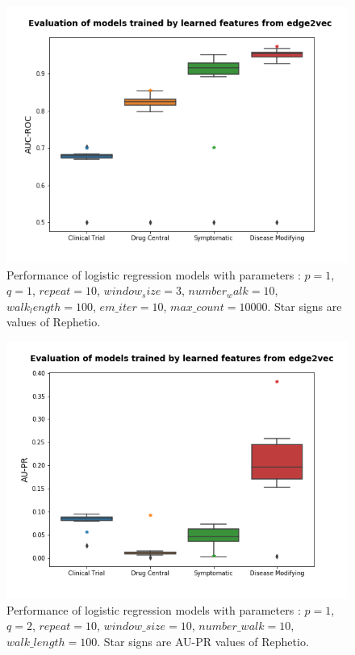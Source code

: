 \begin{figure}[!h]
    \centering
    \includegraphics[scale=0.65]
    {figures/edge2vec_roc.png}
    \captionsetup{justification=centering}
    \caption[AUC-ROCs of logistic regression models trained by learned features from edge2vec]{\label{fig:edge2vec_roc}Performance of logistic regression models with parameters : $p = 1$, $q = 1$, $repeat = 10$, $window_size = 3$, $number_walk = 10$, $walk_length =  100$, $em\_iter = 10$, $max\_count = 10000$. Star signs are values of Rephetio.
}
\end{figure}

\begin{figure}[!h]
    \centering
    \includegraphics[scale=0.65]
    {figures/edge2vec_pr.png}
    \captionsetup{justification=centering}
    \caption[AU-PRs of Logistic regression models trained by learned features from edge2vec]{\label{fig:edge2vec_pr}Performance of logistic regression models with parameters : $p = 1$, $q = 2$, $repeat = 10$, $window\_size = 10$, $number\_walk = 10$, $walk\_length = 100$. Star signs are \ac{AU-PR} values of Rephetio.
}
\end{figure}

